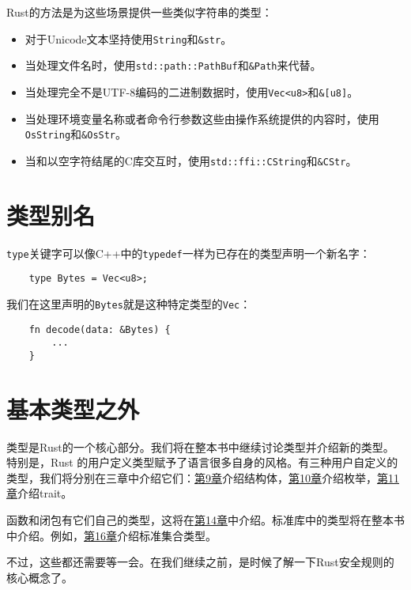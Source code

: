 Rust的方法是为这些场景提供一些类似字符串的类型：
\begin{itemize}
    \item 对于Unicode文本坚持使用\texttt{String}和\texttt{\&str}。
    \item 当处理文件名时，使用\texttt{std::path::PathBuf}和\texttt{\&Path}来代替。
    \item 当处理完全不是UTF-8编码的二进制数据时，使用\texttt{Vec<u8>}和\texttt{\&[u8]}。
    \item 当处理环境变量名称或者命令行参数这些由操作系统提供的内容时，使用\texttt{OsString}和\texttt{\&OsStr}。
    \item 当和以空字符结尾的C库交互时，使用\texttt{std::ffi::CString}和\texttt{\&CStr}。
\end{itemize}

\section{类型别名}

\texttt{type}关键字可以像C++中的\texttt{typedef}一样为已存在的类型声明一个新名字：
\begin{verbatim}
    type Bytes = Vec<u8>;
\end{verbatim}

我们在这里声明的\texttt{Bytes}就是这种特定类型的\texttt{Vec}：
\begin{verbatim}
    fn decode(data: &Bytes) {
        ...
    }
\end{verbatim}

\section{基本类型之外}

类型是Rust的一个核心部分。我们将在整本书中继续讨论类型并介绍新的类型。特别是，Rust 的用户定义类型赋予了语言很多自身的风格。有三种用户自定义的类型，我们将分别在三章中介绍它们：\hyperref[ch09]{第9章}介绍结构体，\hyperref[ch10]{第10章}介绍枚举，\hyperref[ch11]{第11章}介绍trait。

函数和闭包有它们自己的类型，这将在\hyperref[ch14]{第14章}中介绍。标准库中的类型将在整本书中介绍。例如，\hyperref[ch16]{第16章}介绍标准集合类型。

不过，这些都还需要等一会。在我们继续之前，是时候了解一下Rust安全规则的核心概念了。
